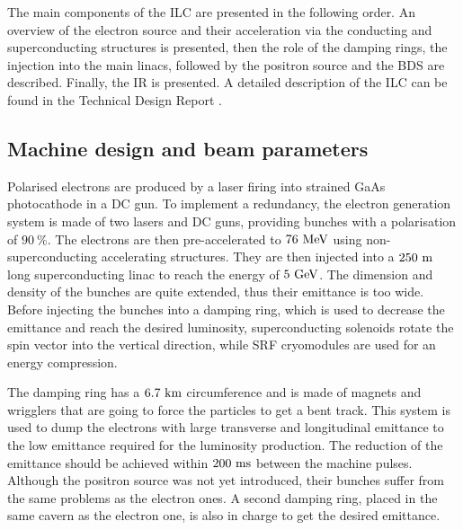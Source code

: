    The main components of the \gls{ILC} are presented in the following order.
    An overview of the electron source and their acceleration via the conducting and superconducting structures is presented, then the role of the damping rings, the injection into the main linacs, followed by the positron source and the \gls{BDS} are described.
    Finally, the \gls{IR} is presented.
    A detailed description of the \gls{ILC} can be found in the Technical Design Report \cite{Appleby2006}.

    \subsection{Machine design and beam parameters}
    \label{subsec:design}

    Polarised electrons are produced by a laser firing into strained GaAs photocathode in a \gls{DC} gun.
    To implement a redundancy, the electron generation system is made of two lasers and \gls{DC} guns, providing bunches with a polarisation of $90~\%$.
    The electrons are then pre-accelerated to $76~\rm{MeV}$ using non-superconducting accelerating structures.
    They are then injected into a $250~\rm{m}$ long superconducting linac to reach the energy of $5~\rm{GeV}$.
    The dimension and density of the bunches are quite extended, thus their emittance is too wide.
    Before injecting the bunches into a damping ring, which is used to decrease the emittance and reach the desired luminosity, superconducting solenoids rotate the spin vector into the vertical direction, while \gls{SRF} cryomodules are used for an energy compression.
 
    The damping ring has a $6.7~\rm{km}$ circumference and is made of magnets and wrigglers that are going to force the particles to get a bent track.
    This system is used to dump the electrons with large transverse and longitudinal emittance to the low emittance required for the luminosity production.
    The reduction of the emittance should be achieved within $200~\rm{ms}$ between the machine pulses.
    Although the positron source was not yet introduced, their bunches suffer from the same problems as the electron ones. 
    A second damping ring, placed in the same cavern as the electron one, is also in charge to get the desired emittance.

